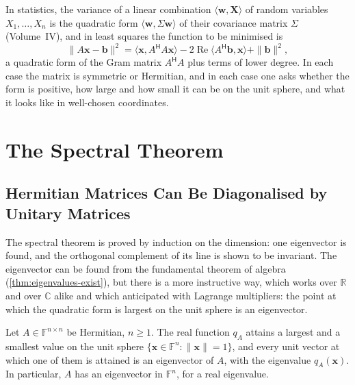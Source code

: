 In statistics, the variance of a linear combination $\langle\mathbf w,\mathbf X\rangle$ of random variables $X_1,\ldots,X_n$ is the quadratic form $\langle\mathbf w,\Sigma\mathbf w\rangle$ of their covariance matrix $\Sigma$ (Volume~IV), and in least squares the function to be minimised is
\[
\|A\mathbf x-\mathbf b\|^2=\langle\mathbf x,A^{\mathsf H}A\mathbf x\rangle-2\operatorname{Re}\langle A^{\mathsf H}\mathbf b,\mathbf x\rangle+\|\mathbf b\|^2 ,
\]
a quadratic form of the Gram matrix $A^{\mathsf H}A$ plus terms of lower degree. In each case the matrix is symmetric or Hermitian, and in each case one asks whether the form is positive, how large and how small it can be on the unit sphere, and what it looks like in well-chosen coordinates.

\section{The Spectral Theorem}
\label{sec:spectral-theorem}

\subsection{Hermitian Matrices Can Be Diagonalised by Unitary Matrices}

The spectral theorem is proved by induction on the dimension: one eigenvector is found, and the orthogonal complement of its line is shown to be invariant. The eigenvector can be found from the fundamental theorem of algebra (\cref{thm:eigenvalues-exist}), but there is a more instructive way, which works over $\mathbb R$ and over $\mathbb C$ alike and which  anticipated with Lagrange multipliers: the point at which the quadratic form is largest on the unit sphere is an eigenvector.

\begin{lemma}
\label{lem:variational-eigenvector}
Let $A\in\mathbb F^{n\times n}$ be Hermitian, $n\ge1$. The real function $q_A$ attains a largest and a smallest value on the unit sphere $\{\mathbf x\in\mathbb F^n:\|\mathbf x\|=1\}$, and every unit vector at which one of them is attained is an eigenvector of $A$, with the eigenvalue $q_A(\mathbf x)$. In particular, $A$ has an eigenvector in $\mathbb F^n$, for a real eigenvalue.
\end{lemma}

